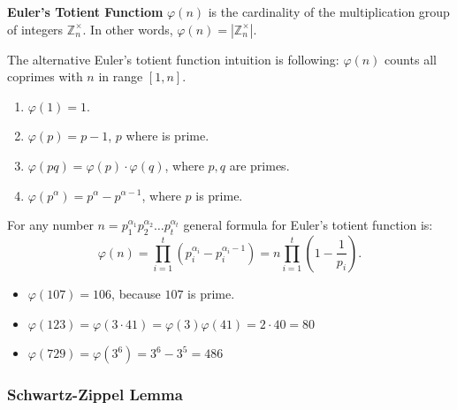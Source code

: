 \documentclass[../lecture-notes.tex]{subfiles}
\begin{document}
\begin{definition}
    \textbf{Euler's Totient Functiom} $\varphi(n)$ is the cardinality of the multiplication 
    group of integers $\mathbb{Z}_n^{\times}$. In other words, $\varphi(n) = |\mathbb{Z}_n^{\times}|$.
\end{definition}

\begin{remark}
    The alternative Euler's totient function intuition is following: $\varphi(n)$ counts all coprimes with $n$ in range $[1, n]$. 
\end{remark}

\begin{lemma} 
    \hfill
    \begin{enumerate}
        \item $\varphi(1) = 1$.
        \item $\varphi(p) = p - 1$, $p$ where is prime.
        \item $\varphi(pq) = \varphi(p) \cdot \varphi(q)$, where $p, q$ are primes.
        \item $\varphi(p^{\alpha}) = p^{\alpha} - p^{\alpha - 1}$, where  $p$ is prime.        
    \end{enumerate}    
\end{lemma}

\begin{corollary}
    For any number $n = p_{1}^{\alpha_1}p_{2}^{\alpha_2} \dots p_{t}^{\alpha_t}$ general formula for Euler's totient function is: 
    \begin{equation*}
        \varphi(n) = \prod_{i = 1}^{t} \left( p_{i}^{\alpha_i} - p_{i}^{\alpha_i - 1} \right) = n \prod_{i = 1}^{t} \left( 1 - \frac{1}{p_i} \right).
    \end{equation*}
\end{corollary}

\begin{example}
    \hfill

    \begin{itemize}
        \item $\varphi(107) = 106$, because $107$ is prime.
        \item $\varphi(123) = \varphi(3 \cdot 41) = \varphi(3)\varphi(41) = 2 \cdot 40 = 80$
        \item $\varphi(729) = \varphi(3^6) = 3^6 - 3^5 = 486$
    \end{itemize}
\end{example}

\subsubsection{Schwartz-Zippel Lemma}
\end{document}
